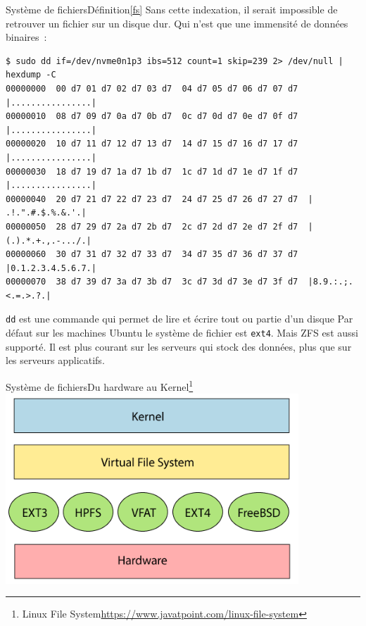 \documentclass{beamer}
\begin{document}
    \begin{frame}[fragile]{Système de fichiers}{Définition\cref{fs}}
        Sans cette indexation, il serait impossible de retrouver un fichier sur un disque dur.
        Qui n'est que une immensité de données binaires~:
        \begin{lstlisting}
$ sudo dd if=/dev/nvme0n1p3 ibs=512 count=1 skip=239 2> /dev/null | hexdump -C
00000000  00 d7 01 d7 02 d7 03 d7  04 d7 05 d7 06 d7 07 d7  |................|
00000010  08 d7 09 d7 0a d7 0b d7  0c d7 0d d7 0e d7 0f d7  |................|
00000020  10 d7 11 d7 12 d7 13 d7  14 d7 15 d7 16 d7 17 d7  |................|
00000030  18 d7 19 d7 1a d7 1b d7  1c d7 1d d7 1e d7 1f d7  |................|
00000040  20 d7 21 d7 22 d7 23 d7  24 d7 25 d7 26 d7 27 d7  | .!.".#.$.%.&.'.|
00000050  28 d7 29 d7 2a d7 2b d7  2c d7 2d d7 2e d7 2f d7  |(.).*.+.,.-.../.|
00000060  30 d7 31 d7 32 d7 33 d7  34 d7 35 d7 36 d7 37 d7  |0.1.2.3.4.5.6.7.|
00000070  38 d7 39 d7 3a d7 3b d7  3c d7 3d d7 3e d7 3f d7  |8.9.:.;.<.=.>.?.|
        \end{lstlisting}
        \lstinline{dd} est une commande qui permet de lire et écrire tout ou partie d'un disque
        \bigbreak
        Par défaut sur les machines Ubuntu le système de fichier est \lstinline{ext4}.
        \bigbreak
        Mais ZFS est aussi supporté.
        Il est plus courant sur les serveurs qui stock des données, plus que sur les serveurs applicatifs.
    \end{frame}

    \begin{frame}{Système de fichiers}{Du hardware au Kernel\footnote{Linux File System\url{https://www.javatpoint.com/linux-file-system}}}
        \centering
        \includegraphics[width=11cm]{image/linux-file-system-stack}
    \end{frame}
\end{document}
